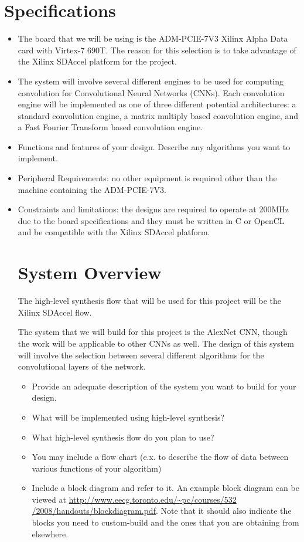 \documentclass[conference,compsoc]{IEEEtran/IEEEtran}
\begin{document}
\section{Specifications}
\begin{itemize}
\item The board that we will be using is the ADM-PCIE-7V3 Xilinx Alpha Data card 
with Virtex-7 690T. The reason for this selection is to take advantage of the 
Xilinx SDAccel platform for the project. 

\item The system will involve several different engines to be used for computing 
convolution for Convolutional Neural Networks (CNNs). Each convolution engine 
will be implemented as one of three different potential architectures: a standard 
convolution engine, a matrix multiply based convolution engine, and a Fast Fourier 
Transform based convolution engine. 

\item Functions and features of your design.
Describe any algorithms you want to implement.


\item Peripheral Requirements: no other equipment is required other than the machine 
containing the ADM-PCIE-7V3.
\item Constraints and limitations: the designs are required to operate at 200MHz due 
to the board specifications and they must be written in C or OpenCL and be compatible 
with the Xilinx SDAccel platform. 

\section{System Overview}

The high-level synthesis flow that will be used for this project will be the Xilinx 
SDAccel flow. 

The system that we will build for this project is the AlexNet CNN, though the work 
will be applicable to other CNNs as well. The design of this system will involve the 
selection between several different algorithms for the convolutional layers of the 
network.

\begin{itemize}
\item Provide an adequate description of the system you want to build for your design.
\item What will be implemented using high-level synthesis?
\item What high-level synthesis flow do you plan to use?
\item You may include a flow chart (e.x. to describe the flow of data between various functions of your algorithm)
\item Include a block diagram and refer to it.
An example block diagram can be viewed at \href{http://www.eecg.toronto.edu/~pc/courses/532/2008/handouts/blockdiagram.pdf}{http://www.eecg.toronto.edu/\~{}pc/courses/532 /2008/handouts/blockdiagram.pdf}.
Note that it should also indicate the blocks you need to custom-build and the ones that you are obtaining from elsewhere.
\end{itemize}


\end{itemize}
\end{document}
